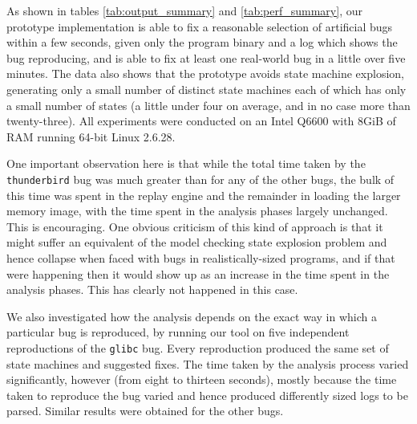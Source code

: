 \documentclass[10pt,letter,twocolumn]{sigplanconf}
\newcommand{\editorial}[1]{}
\begin{document}
As shown in tables \ref{tab:output_summary} and
\ref{tab:perf_summary}, our prototype implementation is able to fix a
reasonable selection of artificial bugs within a few seconds, given
only the program binary and a log which shows the bug reproducing, and
is able to fix at least one real-world bug in a little over five
minutes.  The data also shows that the prototype avoids state machine
explosion, generating only a small number of distinct state machines
each of which has only a small number of states (a little under four
on average, and in no case more than twenty-three).  All experiments
were conducted on an Intel Q6600 with 8GiB of RAM running 64-bit Linux
2.6.28.

One important observation here is that while the total time taken by
the \verb|thunderbird| bug was much greater than for any of the other
bugs, the bulk of this time was spent in the replay engine and the
remainder in loading the larger memory image, with the time spent in
the analysis phases largely unchanged.  This is encouraging.  One
obvious criticism of this kind of approach is that it might suffer an
equivalent of the model checking state explosion problem and hence
collapse when faced with bugs in realistically-sized programs, and if
that were happening then it would show up as an increase in the time
spent in the analysis phases.  This has clearly not happened in this
case.

We also investigated how the analysis depends on the exact way in 
which a particular bug is reproduced, by running our tool
on five independent reproductions of the \verb|glibc| bug.  Every
reproduction produced the same set of state machines and suggested
fixes.  The time taken by the analysis process varied significantly,
however (from eight to thirteen seconds), mostly because the time
taken to reproduce the bug varied and hence produced differently sized
logs to be parsed. Similar results were obtained for the other
bugs.\editorial{Not sure this is all that interesting, or that I've
  phrased it very well...}

\end{document}
